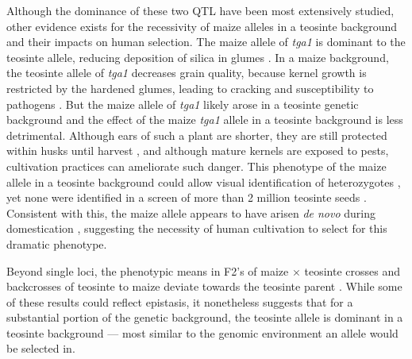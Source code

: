 \documentclass[a4paper]{article}
\newcommand{\mcs}[1]{\todo[size=\tiny, color=magenta!20]{#1}}
\newcommand{\jri}[1]{\todo[size=\tiny, color=green!20]{#1}}
\begin{document}
﻿Although the dominance of these two QTL have been most extensively studied, other evidence exists for the recessivity of maize alleles in a teosinte background and their impacts on human selection.
The maize allele of \textit{tga1} is dominant to the teosinte allele, reducing deposition of silica in glumes \citep{dorweiler1997}.
In a maize background, the teosinte allele of \textit{tga1} decreases grain quality, because kernel growth is restricted by the hardened glumes, leading to cracking and susceptibility to pathogens \citep{dorweiler1993}.
But the maize allele of \textit{tga1} likely arose in a teosinte genetic background and the effect of the maize \textit{tga1} allele in a teosinte background is less detrimental.
Although ears of such a plant are shorter, they are still protected within husks until harvest \citep{dorweiler1993},  and although mature kernels are exposed to pests, cultivation practices can ameliorate such danger.
This phenotype of the maize allele in a teosinte background could allow visual identification of heterozygotes \citep{wang2005}, yet none were identified in a screen of more than 2 million teosinte seeds \citep{beadle1980, wilkes2004, bergsingerbook}.
Consistent with this, the maize allele appears to have arisen \textit{de novo} during domestication  \citep{wang2015}, suggesting  the necessity of human cultivation to select for this dramatic phenotype.

﻿Beyond single loci, the phenotypic means in F2's of maize $\times$ teosinte crosses and backcrosses of teosinte to maize deviate towards the teosinte parent \citep{lambert1965, doebley1990, doebley1993,  doebley1995}.
While some of these results could reflect epistasis, it nonetheless suggests that for a substantial portion of the genetic background, the teosinte allele is dominant in a teosinte background --- most similar to the genomic environment an allele would be selected in.  %
\end{document}
